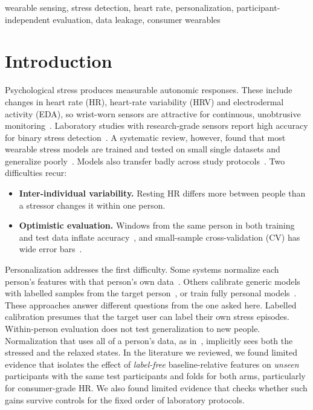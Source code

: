 \documentclass[conference]{IEEEtran}
\begin{document}
\begin{IEEEkeywords}
wearable sensing, stress detection, heart rate, personalization, participant-independent evaluation, data leakage, consumer wearables
\end{IEEEkeywords}

\section{Introduction}
Psychological stress produces measurable autonomic responses. These include changes in heart rate (HR), heart-rate variability (HRV) and electrodermal activity (EDA), so wrist-worn sensors are attractive for continuous, unobtrusive monitoring~\cite{giannakakis2022review,schmidt2019review,kim2018hrv}. Laboratory studies with research-grade sensors report high accuracy for binary stress detection~\cite{schmidt2018wesad}. A systematic review, however, found that most wearable stress models are trained and tested on small single datasets and generalize poorly~\cite{vos2023generalizable}. Models also transfer badly across study protocols~\cite{mishra2020reproducibility}. Two difficulties recur:
\begin{itemize}
\item \textbf{Inter-individual variability.} Resting HR differs more between people than a stressor changes it within one person.
\item \textbf{Optimistic evaluation.} Windows from the same person in both training and test data inflate accuracy~\cite{saeb2017usecase}, and small-sample cross-validation (CV) has wide error bars~\cite{varoquaux2018cv}.
\end{itemize}

Personalization addresses the first difficulty. Some systems normalize each person's features with that person's own data~\cite{hovsepian2015cstress}. Others calibrate generic models with labelled samples from the target person~\cite{nkurikiyeyezu2020person,sah2021personalization}, or train fully personal models~\cite{tervonen2020som}. These approaches answer different questions from the one asked here. Labelled calibration presumes that the target user can label their own stress episodes. Within-person evaluation does not test generalization to new people. Normalization that uses all of a person's data, as in~\cite{hovsepian2015cstress}, implicitly sees both the stressed and the relaxed states. In the literature we reviewed, we found limited evidence that isolates the effect of \emph{label-free} baseline-relative features on \emph{unseen} participants with the same test participants and folds for both arms, particularly for consumer-grade HR. We also found limited evidence that checks whether such gains survive controls for the fixed order of laboratory protocols.
\end{document}

